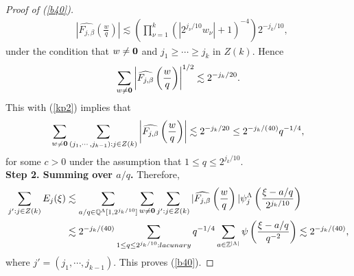 \documentclass[10pt,a4paper]{amsart}
\numberwithin{equation}{section}
\begin{document}
\begin{proof}[Proof of  (\ref{b40})]
\begin{align*}
&\left|\widehat{F_{j,\beta}}\left(\frac{w}{q} \right)\right| \lesssim  \left(\prod_{\nu=1}^k (|2^{j_\nu/10}w_\nu|+1)^{-4} \right)
  2^{-j_k/10},
\end{align*}
under the condition that
$w \ne {\bf 0}$ and $j_1\ge \cdots \ge j_k$ in $Z(k)$. Hence
\begin{align*}
  \sum_{w \ne {\bf 0}}   \left|\widehat{F_{j,\beta}}\left(\frac{w}{q} \right)\right|^{1/2} \lesssim 2^{-j_k/20}.
\end{align*}
This with (\ref{kp2})  implies that
\begin{align*} 
  \sum_{w \ne {\bf 0}}\sum_{(j_1,\cdots,j_{k-1}):j\in Z(k)} 
 \left|\widehat{F_{j,\beta}}\left(\frac{w}{q} \right)\right| \lesssim 2^{-j_k/20} \le 2^{-j_k/(40)}q^{-1/4},
\end{align*}
for some $c>0$ under the assumption that $1\le q\le 2^{j_k/10}$. 
\\
\textbf{Step 2. Summing over $a/q$.}
Therefore, 
\begin{align*}
\sum_{j'  :j\in Z(k)} E_j(\xi)&\lesssim \sum_{a/q\in \mathbb{Q}^{\Lambda}[1, 2^{j_k/10}] } \sum_{w \ne {\bf 0}}  \sum_{j':j\in Z(k)} |\widehat{F_{j,\beta}}\left(\frac{w}{q}  \right)|   \psi_j^{\Lambda}\left( \frac{\xi-a/q}{2^{j_{k}/10}} \right)\\
&\lesssim 2^{-j_k/(40)} \sum_{1\le q\le 2^{j_k/10}:\rm{lacunary}}q^{-1/4}\sum_{a\in\mathbb{Z}^{|\Lambda|}}\psi\left( \frac{\xi-a/q}{q^{-2}}\right)  \lesssim 2^{-j_k/(40)},
\end{align*}
where $j'=(j_1,\cdots,j_{k-1})$. This proves (\ref{b40}).  
\end{proof}





 
\end{document}

